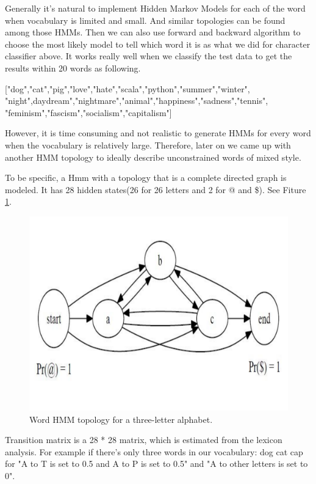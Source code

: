 \begin{enumerate}
Generally it’s natural to implement Hidden Markov Models for each of the word when vocabulary is limited and small. And similar topologies can be found among those HMMs. Then we can also use forward and backward algorithm to choose the most likely model to tell which word it is as what we did for character classifier above. It works really well when we classify the test data to get the results within 20 words as following.

["dog","cat","pig","love","hate","scala","python","summer","winter",\\"night",daydream","nightmare","animal","happiness","sadness","tennis",\\"feminism","fascism","socialism","capitalism"]

However, it is time consuming and not realistic to generate HMMs for every word when the vocabulary is relatively large. Therefore, later on we came up with another HMM topology to ideally describe unconstrained words of mixed style.

To be specific, a Hmm  with a topology that is a complete directed graph is modeled. It has 28 hidden states(26 for 26 letters and 2 for @ and \$). See Fiture \ref{figure:wordtopology}. 

\begin{figure}[h!]
  \centering
  \includegraphics[width=5in]{wordtopology}
  \caption{Word HMM topology for a three-letter alphabet.}
  \label{figure:wordtopology}
\end{figure}


Transition matrix is a 28 * 28 matrix, which is estimated from the lexicon analysis. For example if there's only three words in our vocabulary: dog cat cap for "A to T is set to 0.5 and A to P is set to 0.5" and "A to other letters is set to 0".


\end{enumerate}
